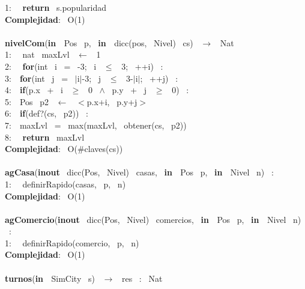 \begin{Algoritmos}
1: \  \ \textbf{return} \ s.popularidad\\
\textbf{Complejidad}: \ O(1)\\
\makebox[\linewidth]{\rule{\textwidth}{0.4pt}}
\\
\makebox[\linewidth]{\rule{\textwidth}{0.4pt}}
\textbf{nivelCom}(\textbf{in \ }Pos \ p, \ \textbf{in \ }dicc(pos, \ Nivel) \ cs) \ $\rightarrow $ \ Nat\\
1: \  \ nat \ maxLvl \ $\leftarrow$ \ 1\\
2: \  \ \textbf{for}(int \ i \ = \ -3; \ i \ $\leq$ \ 3; \ ++i) \ :\\
3:\indent  \  \ \textbf{for}(int \ j \ = \ $\mid$i$\mid$-3; \ j \ $\leq$ \ 3-$\mid$i$\mid$; \ ++j) \ :\\
4:\indent \indent  \  \ \textbf{if}(p.x \ + \ i \ $\geq$ \ 0 \ $\wedge$ \ p.y \ + \ j \ $\geq$ \ 0) \ :\\
5:\indent \indent \indent  \  \ Pos \ p2 \ $\leftarrow$ \ $<$p.x+i, \ p.y+j$>$ \ \\
6:\indent \indent \indent  \  \ \textbf{if}(def?(cs, \ p2)) \ :\\
7:\indent \indent \indent \indent  \  \ maxLvl \ = \ max(maxLvl, \ obtener(cs, \ p2))\\
8: \  \ \textbf{return} \ maxLvl\\
\textbf{Complejidad}: \ O($ \# $claves(cs))\\
\makebox[\linewidth]{\rule{\textwidth}{0.4pt}}
\\
\makebox[\linewidth]{\rule{\textwidth}{0.4pt}}
\textbf{agCasa}(\textbf{inout} \ dicc(Pos, \ Nivel) \ casas, \ \textbf{in \ }Pos \ p, \ \textbf{in \ }Nivel \ n) \ :\\
1: \  \ definirRapido(casas, \ p, \ n)\\
\textbf{Complejidad}: \ O(1)\\
\makebox[\linewidth]{\rule{\textwidth}{0.4pt}}
\\
\makebox[\linewidth]{\rule{\textwidth}{0.4pt}}
\textbf{agComercio}(\textbf{inout} \ dicc(Pos, \ Nivel) \ comercios, \ \textbf{in \ }Pos \ p, \ \textbf{in \ }Nivel \ n) \ :\\
1: \  \ definirRapido(comercio, \ p, \ n)\\
\textbf{Complejidad}: \ O(1)\\
\makebox[\linewidth]{\rule{\textwidth}{0.4pt}}
\\
\makebox[\linewidth]{\rule{\textwidth}{0.4pt}}
\textbf{turnos}(\textbf{in \ }SimCity \ s) \ $\rightarrow $ \ res \ : \ Nat\\

\end{Algoritmos}
